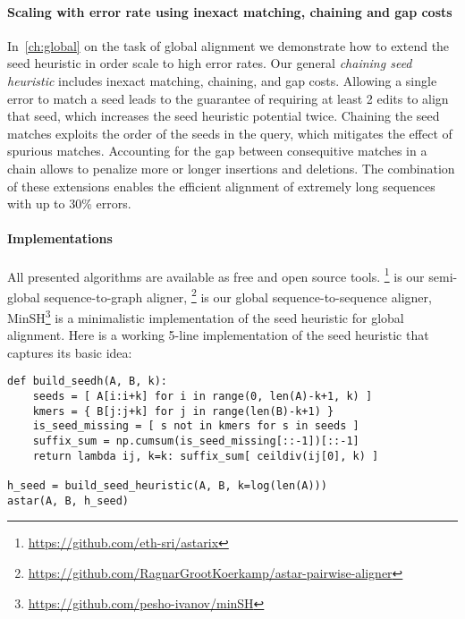 \paragraph{Scaling with error rate using inexact matching, chaining and gap costs}
In~\cref{ch:global} on the task of global alignment we demonstrate how to extend
the seed heuristic in order scale to high error rates. Our general
\emph{chaining seed heuristic} includes inexact matching, chaining, and gap
costs. Allowing a single error to match a seed leads to the guarantee of
requiring at least 2 edits to align that seed, which increases the seed
heuristic potential twice. Chaining the seed matches exploits the order of the
seeds in the query, which mitigates the effect of spurious matches. Accounting
for the gap between consequitive matches in a chain allows to penalize more or
longer insertions and deletions. The combination of these extensions enables the
efficient alignment of extremely long sequences with up to 30\% errors. 

\paragraph{Implementations}
All presented algorithms are available as free and open source tools.
\astarix\footnote{\url{https://github.com/eth-sri/astarix}} is our semi-global
sequence-to-graph aligner,
\astarpa\footnote{\url{https://github.com/RagnarGrootKoerkamp/astar-pairwise-aligner}}
is our global sequence-to-sequence aligner,
MinSH\footnote{\url{https://github.com/pesho-ivanov/minSH}} is a minimalistic
implementation of the seed heuristic for global alignment. Here is a working
5-line implementation of the seed heuristic that captures its basic idea:

\begin{samepage}
\begin{verbatim}
def build_seedh(A, B, k):
    seeds = [ A[i:i+k] for i in range(0, len(A)-k+1, k) ]
    kmers = { B[j:j+k] for j in range(len(B)-k+1) }
    is_seed_missing = [ s not in kmers for s in seeds ]
    suffix_sum = np.cumsum(is_seed_missing[::-1])[::-1]
    return lambda ij, k=k: suffix_sum[ ceildiv(ij[0], k) ]

h_seed = build_seed_heuristic(A, B, k=log(len(A)))
astar(A, B, h_seed)
\end{verbatim}
\end{samepage}